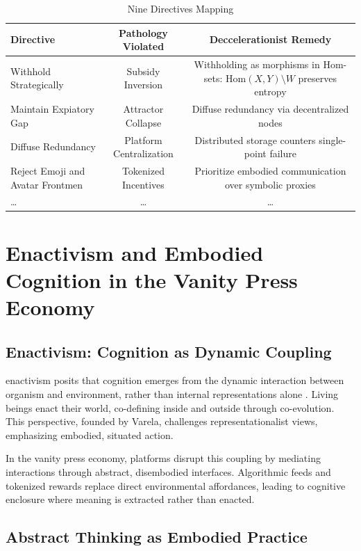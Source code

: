 \documentclass[12pt]{article}
\begin{document}
\begin{table}[h]
\caption{Nine Directives Mapping}
\begin{center}
\begin{tabular}{lcc}
\toprule
Directive & Pathology Violated & Deccelerationist Remedy \\
\midrule
Withhold Strategically & Subsidy Inversion & Withholding as morphisms in Hom-sets: $\text{Hom}(X,Y) \setminus W$ preserves entropy \\
Maintain Expiatory Gap & Attractor Collapse & Diffuse redundancy via decentralized nodes \\
Diffuse Redundancy & Platform Centralization & Distributed storage counters single-point failure \\
Reject Emoji and Avatar Frontmen & Tokenized Incentives & Prioritize embodied communication over symbolic proxies \\
\ldots & \ldots & \ldots \\
\bottomrule
\end{tabular}
\end{center}
\label{tab:directives}
\end{table}

\section{Enactivism and Embodied Cognition in the Vanity Press Economy}

\subsection{Enactivism: Cognition as Dynamic Coupling}

\gls{enactivism} posits that cognition emerges from the dynamic interaction between organism and environment, rather than internal representations alone \citep{Gallagher2017}. Living beings enact their world, co-defining inside and outside through co-evolution. This perspective, founded by Varela, challenges representationalist views, emphasizing embodied, situated action.

In the vanity press economy, platforms disrupt this coupling by mediating interactions through abstract, disembodied interfaces. Algorithmic feeds and tokenized rewards replace direct environmental affordances, leading to cognitive enclosure where meaning is extracted rather than enacted.

\subsection{Abstract Thinking as Embodied Practice}
\end{document}
